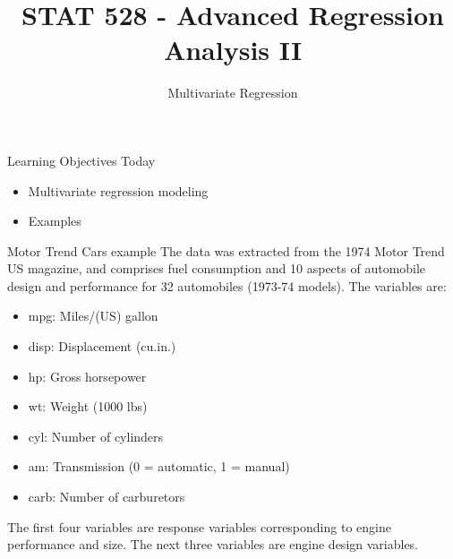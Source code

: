 \documentclass[
  ignorenonframetext,
]{beamer}
\title{STAT 528 - Advanced Regression Analysis II}
\author{Multivariate Regression}
\date{}
\institute{Daniel J. Eck\\
Department of Statistics\\
University of Illinois}
\providecommand{\tightlist}{%
  \setlength{\itemsep}{0pt}\setlength{\parskip}{0pt}}
\begin{document}
\frame{\titlepage}

\begin{frame}
\newcommand{\Var}{\mathrm{Var}}
\newcommand{\Prob}{\mathbb{P}}
\newcommand{\R}{\mathbb{R}}
\newcommand{\E}{\mathrm{E}}
\newcommand{\Y}{\mathbb{Y}}
\newcommand{\X}{\mathbb{X}}
\end{frame}

\begin{frame}{Learning Objectives Today}
\protect\hypertarget{learning-objectives-today}{}
\begin{itemize}
\tightlist
\item
  Multivariate regression modeling
\item
  Examples
\end{itemize}
\end{frame}

\begin{frame}{Motor Trend Cars example}
\protect\hypertarget{motor-trend-cars-example}{}
The data was extracted from the 1974 Motor Trend US magazine, and
comprises fuel consumption and 10 aspects of automobile design and
performance for 32 automobiles (1973-74 models). The variables are:

\begin{itemize}
\tightlist
\item
  mpg: Miles/(US) gallon
\item
  disp: Displacement (cu.in.)
\item
  hp: Gross horsepower
\item
  wt: Weight (1000 lbs)
\item
  cyl: Number of cylinders
\item
  am: Transmission (0 = automatic, 1 = manual)
\item
  carb: Number of carburetors
\end{itemize}

The first four variables are response variables corresponding to engine
performance and size. The next three variables are engine design
variables.
\end{frame}
\end{document}
